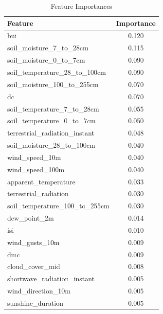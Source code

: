\begin{table}[H]
	\caption{Feature Importances}
	\centering
	\label{feature_importances}
	\begin{tabular}{lc}
		\hline
		Feature                                & Importance \\ \hline
		bui                                        & 0.120       \\ 
		soil\_moisture\_7\_to\_28cm             & 0.115       \\ 
		soil\_moisture\_0\_to\_7cm               & 0.090       \\ 
		soil\_temperature\_28\_to\_100cm        & 0.090       \\ 
		soil\_moisture\_100\_to\_255cm         & 0.070       \\ 
		dc                                         & 0.070       \\ 
		soil\_temperature\_7\_to\_28cm          & 0.055       \\ 
		soil\_temperature\_0\_to\_7cm           & 0.050       \\ 
		terrestrial\_radiation\_instant           & 0.048       \\ 
		soil\_moisture\_28\_to\_100cm          & 0.040       \\ 
		wind\_speed\_10m                        & 0.040       \\ 
		wind\_speed\_100m                       & 0.040       \\ 
		apparent\_temperature                 & 0.033       \\ 
		terrestrial\_radiation                   & 0.030       \\ 
		soil\_temperature\_100\_to\_255cm       & 0.030       \\ 
		dew\_point\_2m                          & 0.014       \\ 
		isi                                       & 0.010       \\ 
		wind\_gusts\_10m                        & 0.009       \\ 
		dmc                                        & 0.009       \\ 
		cloud\_cover\_mid                       & 0.008       \\ 
		shortwave\_radiation\_instant          & 0.005       \\ 
		wind\_direction\_10m                    & 0.005       \\ 
		sunshine\_duration                      & 0.005       \\ 

\end{tabular}
\end{table}
